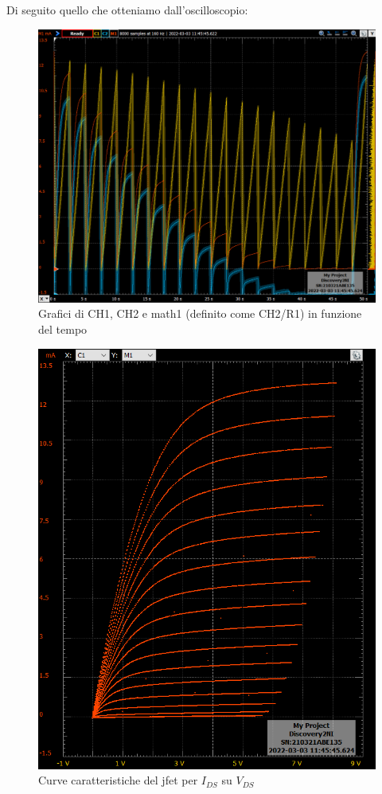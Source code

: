 \documentclass[10pt, a4paper, italian]{article}
\begin{document}
Di seguito quello che otteniamo dall'oscilloscopio:
\begin{figure}[H]
    \centering
	\includegraphics[scale=0.4]{time}
    \caption{Grafici di CH1, CH2 e math1 (definito come CH2/R1) in funzione del tempo}
\end{figure}
\begin{figure}[H]
    \centering
	\includegraphics[scale=0.4]{vgs}
    \caption{Curve caratteristiche del jfet per $I_{DS}$ su $V_{DS}$}
\end{figure}
\end{document}
